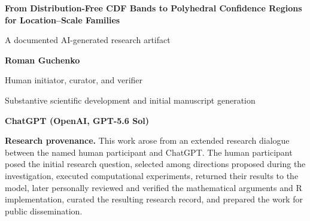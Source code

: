 \documentclass[11pt]{article}
\begin{document}


\begin{titlepage}

\centering

\vspace*{1.5cm}

{\LARGE\bfseries
From Distribution-Free CDF Bands to Polyhedral Confidence Regions\\[0.3em]
for Location--Scale Families
\par}

\vspace{1.0cm}

{\large
A documented AI-generated research artifact
\par}

\vspace{1.5cm}

{\large\bfseries Roman Guchenko\par}
\vspace{0.2cm}
{\normalsize
Human initiator, curator, and verifier
\par}

\vspace{1.2cm}

{\normalsize
Substantive scientific development and initial manuscript generation
\par}
\vspace{0.2cm}
{\large\bfseries
ChatGPT (OpenAI, GPT-5.6 Sol)
\par}

\vspace{1.5cm}

\begin{minipage}{0.90\textwidth}
\small
\textbf{Research provenance.}
This work arose from an extended research dialogue between the named
human participant and ChatGPT.  The human participant posed the initial
research question, selected among directions proposed during the
investigation, executed computational experiments, returned their
results to the model, later personally reviewed and verified the
mathematical arguments and R implementation, curated the resulting
research record, and prepared the work for public dissemination.


\end{minipage}
\end{titlepage}
\end{document}
